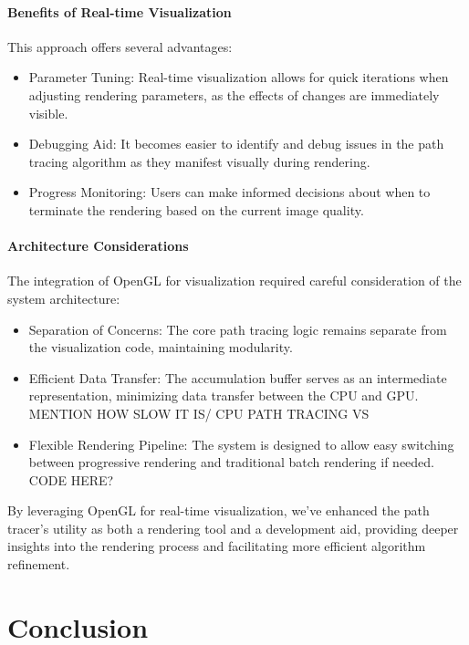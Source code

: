 \documentclass[12pt]{article}
\begin{document}
\paragraph{Benefits of Real-time Visualization}

This approach offers several advantages:

\begin{itemize}
    \item Parameter Tuning: Real-time visualization allows for quick iterations when adjusting rendering parameters, as the effects of changes are immediately visible.
    \item Debugging Aid: It becomes easier to identify and debug issues in the path tracing algorithm as they manifest visually during rendering.
    \item Progress Monitoring: Users can make informed decisions about when to terminate the rendering based on the current image quality.
\end{itemize}

\paragraph{Architecture Considerations}

The integration of OpenGL for visualization required careful consideration of the system architecture:

\begin{itemize}
    \item Separation of Concerns: The core path tracing logic remains separate from the visualization code, maintaining modularity.
    \item Efficient Data Transfer: The accumulation buffer serves as an intermediate representation, minimizing data transfer between the CPU and GPU. MENTION HOW SLOW IT IS/ CPU PATH TRACING VS
    \item Flexible Rendering Pipeline: The system is designed to allow easy switching between progressive rendering and traditional batch rendering if needed. CODE HERE?
\end{itemize}

By leveraging OpenGL for real-time visualization, we've enhanced the path tracer's utility as both a rendering tool and a development aid, providing deeper insights into the rendering process and facilitating more efficient algorithm refinement.

\section{Conclusion}
\label{sec:conclusion}
\end{document}
